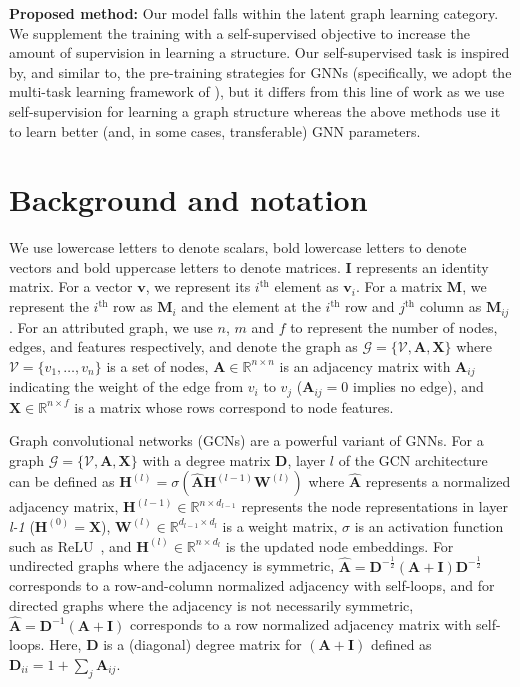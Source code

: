 \documentclass{article}
\def\vv{{\bm{v}}}
\def\mA{{\bm{A}}}
\def\mD{{\bm{D}}}
\def\mH{{\bm{H}}}
\def\mI{{\bm{I}}}
\def\mM{{\bm{M}}}
\def\mW{{\bm{W}}}
\def\mX{{\bm{X}}}
\newcommand{\graph}[1]{\ensuremath{\mathcal{#1}}}
\newcommand{\vertices}[1]{\ensuremath{\mathcal{#1}}}
\newcommand{\Th}[1]{\ensuremath{#1^{\text{th}}}}
\begin{document}
\textbf{Proposed method:} Our model falls within the latent graph learning category. 
We supplement the training with a self-supervised objective to increase the amount of supervision in learning a structure. 
Our self-supervised task is inspired by, and similar to, the pre-training strategies for GNNs \citep{hu2020strategies,hu2020gpt,jin2020self,you2020does,zhu2020self} (specifically, we adopt the multi-task learning framework of \citet{you2020does}), but it differs from this line of work as we use self-supervision for learning a graph structure whereas the above methods use it to learn better (and, in some cases, transferable) GNN parameters. 

\section{Background and notation} \label{sec:background}
We use lowercase letters to denote scalars, bold lowercase letters to denote vectors and bold uppercase letters to denote matrices. $\mI$ represents an identity matrix. For a vector $\vv$, we represent its $\Th{i}$ element as $\vv_i$. For a matrix $\mM$, we represent the $\Th{i}$ row as $\mM_i$ and the element at the $\Th{i}$ row and $\Th{j}$ column as $\mM_{ij}$. For an attributed graph, we use $n$, $m$ and $f$ to represent the number of nodes, edges, and features respectively, and denote the graph as $\graph{G}=\{ \vertices{V}, \mA, \mX\}$ where $\vertices{V}=\{v_1, \dots, v_n\}$ is a set of nodes, $\mA\in\mathbb{R}^{n\times n}$ is an adjacency matrix with $\mA_{ij}$ indicating the weight of the edge from $v_i$ to $v_j$ ($\mA_{ij}=0$ implies no edge), and $\mX\in\mathbb{R}^{n\times f}$ is a matrix whose rows correspond to node features. 

Graph convolutional networks (GCNs) \cite{kipf2017semi} are a powerful variant of GNNs. For a graph $\graph{G}=\{ \vertices{V}, \mA, \mX\}$ with a degree matrix $\mD$, layer $l$ of the GCN architecture can be defined as $\mH^{(l)} = \sigma(\hat{\mA}\mH^{(l-1)}\mW^{(l)})$ where $\hat{\mA}$ represents a normalized adjacency matrix, $\mH^{(l-1)}\in\mathbb{R}^{n\times d_{l-1}}$ represents the node representations in layer \emph{l-1} ($\mH^{(0)}=\mX$), $\mW^{(l)}\in\mathbb{R}^{d_{l-1}\times d_l}$ is a weight matrix, $\sigma$ is an activation function such as ReLU~\cite{relu}, and $\mH^{(l)}\in\mathbb{R}^{n\times d_l}$ is the updated node embeddings. For undirected graphs where the adjacency is symmetric,   $\hat{\mA}=\mD^{-\frac{1}{2}}(\mA+\mI)\mD^{-\frac{1}{2}}$ corresponds to a row-and-column normalized adjacency with self-loops, and for directed graphs where the adjacency is not necessarily symmetric, $\hat{\mA}=\mD^{-1}(\mA+\mI)$ corresponds to a row normalized adjacency matrix with self-loops. Here, $\mD$ is a (diagonal) degree matrix for $(\mA+\mI)$ defined as $\mD_{ii}=1+\sum_j \mA_{ij}$.
\end{document}
